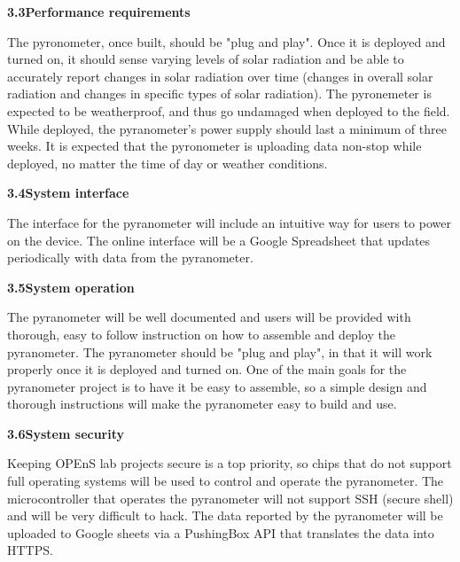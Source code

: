 \documentclass[10pt,draftclsnofoot,onecolumn,letterpaper]{article}
\begin{document}
{\fontsize{10pt}{12.0pt} \textbf{3.3\quad Performance requirements}\\\selectfont 
\par}\par
{\fontsize{10pt}{12.0pt} The pyronometer, once built, should be "plug and play". Once it is deployed and turned on, it should sense varying levels of solar radiation and be able to accurately report changes in solar radiation over time (changes in overall solar radiation and changes in specific types of solar radiation). The pyronemeter is expected to be weatherproof, and thus go undamaged when deployed to the field. While deployed, the pyranometer's power supply should last a minimum of three weeks. It is expected that the pyronometer is uploading data non-stop while deployed, no matter the time of day or weather conditions. \\\selectfont 
\par}\par


{\fontsize{10pt}{12.0pt} \textbf{3.4\quad System interface}\\\selectfont 
\par}\par
{\fontsize{10pt}{12.0pt}
The interface for the pyranometer will include an intuitive way for users to power on the device. The online interface will be a Google Spreadsheet that updates periodically with data from the pyranometer.
\\\selectfont 
\par}\par

{\fontsize{10pt}{12.0pt} \textbf{3.5\quad System operation}\\\selectfont 
\par}\par
{\fontsize{10pt}{12.0pt}
The pyranometer will be well documented and users will be provided with thorough, easy to follow instruction on how to assemble and deploy the pyranometer. The pyranometer should be "plug and play", in that it will work properly once it is deployed and turned on. One of the main goals for the pyranometer project is to have it be easy to assemble, so a simple design and thorough instructions will make the pyranometer easy to build and use.
\\\selectfont 
\par}\par

{\fontsize{10pt}{12.0pt} \textbf{3.6\quad System security}\\\selectfont 
\par}\par
{\fontsize{10pt}{12.0pt}
Keeping OPEnS lab projects secure is a top priority, so chips that do not support full operating systems will be used to control and operate the pyranometer. The microcontroller that operates the pyranometer will not support SSH (secure shell) and will be very difficult to hack. The data reported by the pyranometer will be uploaded to Google sheets via a PushingBox API that translates the data into HTTPS.
\\\selectfont 
\par}\par
\end{document}

